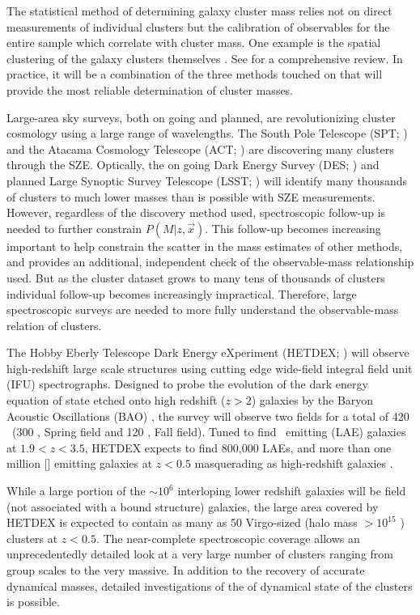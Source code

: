\documentclass[fleqn,usenatbib]{mnras}
\begin{document}
The statistical method of determining galaxy cluster mass relies not on direct measurements of individual clusters but the calibration of observables for the entire sample which correlate with cluster mass. One example is the spatial clustering of the galaxy clusters themselves . See \cite{Weinberg2013} for a comprehensive review. In practice, it will be a combination of the three methods touched on that will provide the most reliable determination of cluster masses.

Large-area sky surveys, both on going and planned, are revolutionizing cluster cosmology using a large range of wavelengths. The South Pole Telescope (SPT; \citealt{Carlstrom2011}) and the Atacama Cosmology Telescope (ACT; \citealt{Swetz2011}) are discovering many clusters through the SZE. Optically, the on going Dark Energy Survey (DES; \citealt{DES2005}) and planned Large Synoptic Survey Telescope (LSST; \citealt{LSST2012}) will identify many thousands of clusters to much lower masses than is possible with SZE measurements. However, regardless of the discovery method used, spectroscopic follow-up is needed to further constrain $P(M|z,\vec{x})$. This follow-up becomes increasing important to help constrain the scatter in the mass estimates of other methods, and provides an additional, independent check of the observable-mass relationship used. But as the cluster dataset grows to many tens of thousands of clusters individual follow-up becomes increasingly impractical. Therefore, large spectroscopic surveys are needed to more fully understand the observable-mass relation of clusters.

The Hobby Eberly Telescope Dark Energy eXperiment (HETDEX; \citealt{Hill2008}) will observe high-redshift large scale structures using cutting edge wide-field integral field unit (IFU) spectrographs. Designed to probe the evolution of the dark energy equation of state etched onto high redshift ($z>2$) galaxies by the Baryon Acoustic Oscillations (BAO) \citep{Eisenstein2005}, the survey will observe two fields for a total of 420 \degsq\ (300 \degsq, Spring field and 120 \degsq, Fall field). Tuned to find \lya\ emitting (LAE) galaxies at $1.9<z<3.5$, HETDEX expects to find 800,000 LAEs, and more than one million [] emitting galaxies at $z<0.5$ masquerading as high-redshift galaxies \citep{Acquaviva2014}. 

While a large portion of the $\sim10^6$ interloping lower redshift galaxies will be field (not associated with a bound structure) galaxies, the large area covered by HETDEX is expected to contain as many as 50 Virgo-sized (halo mass $>10^{15}$ \msol) clusters at $z<0.5$. The near-complete spectroscopic coverage allows an unprecedentedly detailed look at a very large number of clusters ranging from group scales to the very massive. In addition to the recovery of accurate dynamical masses, detailed investigations of the of dynamical state of the clusters is possible. 
\end{document}
